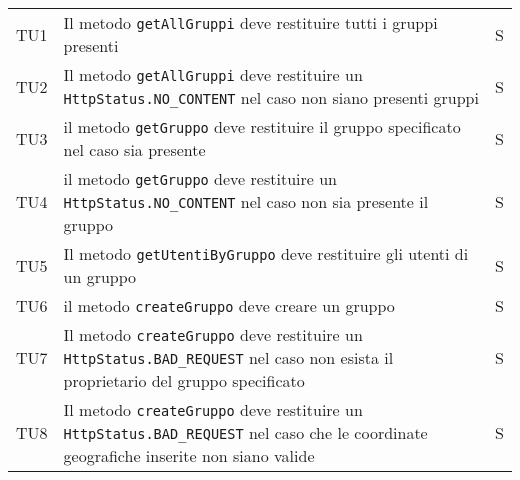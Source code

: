 \begin{center}
{\begin{longtable}{
      |>{\centering\arraybackslash}p{48pt}
      |>{\centering\arraybackslash}p{308pt}
      |>{\centering\arraybackslash}p{27pt}|}
      TU1                                                                        & Il metodo \texttt{getAllGruppi}
      deve restituire tutti i gruppi presenti
                                                                                 & S                                              \\
      TU2                                                                        & Il metodo \texttt{getAllGruppi}
      deve restituire un \texttt{HttpStatus.NO\_CONTENT} nel caso non siano presenti
      gruppi                                                                     & S                                              \\
      TU3                                                                        & il metodo \texttt{getGruppo} deve
      restituire il gruppo specificato nel caso sia presente                     & S                                              \\
      TU4                                                                        & il metodo \texttt{getGruppo} deve
      restituire un \texttt{HttpStatus.NO\_CONTENT} nel caso non sia presente il
      gruppo                                                                     & S                                              \\
      TU5                                                                        & Il metodo
      \texttt{getUtentiByGruppo} deve restituire gli utenti di un gruppo         & S                                              \\
      TU6                                                                        & il metodo \texttt{createGruppo}
      deve creare un gruppo                                                      & S                                              \\
      TU7                                                                        & Il metodo \texttt{createGruppo}
      deve restituire un \texttt{ HttpStatus.BAD\_REQUEST} nel caso non esista il
      proprietario del gruppo specificato                                        & S                                              \\
      TU8                                                                        & Il metodo \texttt{createGruppo}
      deve restituire un \texttt{ HttpStatus.BAD\_REQUEST} nel caso che le coordinate
      geografiche inserite non siano valide                                      & S                                              \\

\end{longtable}}
\end{center}
